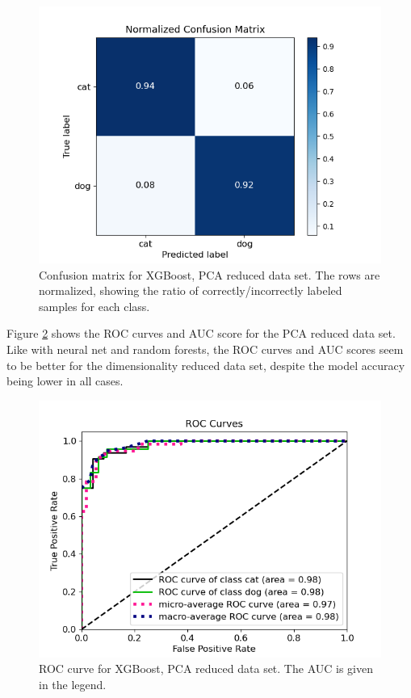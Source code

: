 \documentclass[a4paper]{article}
\begin{document}
\begin{figure}[H]
	\centering
	\includegraphics[scale=0.6]{../figures/xgboost/confusion_matrix_nbins200_pca35_seed4155_ts0.20.png}
	\caption{Confusion matrix for XGBoost, PCA reduced data set. The rows are normalized, showing the ratio of correctly/incorrectly labeled samples for each class.}
	\label{fig:xgboost_confusion_pca}
\end{figure}	
Figure \ref{fig:xgboost_roc_pca} shows the ROC curves and AUC score for the PCA reduced data set. Like with neural net and random forests, the ROC curves and AUC scores seem to be better for the dimensionality reduced data set, despite the model accuracy being lower in all cases.

\begin{figure}[H]
	\centering
	\includegraphics[scale=0.5]{../figures/xgboost/roc_nbins200_pca35_seed4155_ts0.20.png}
	\caption{ROC curve for XGBoost, PCA reduced data set. The AUC is given in the legend.}
	\label{fig:xgboost_roc_pca}
\end{figure}	
\end{document}
